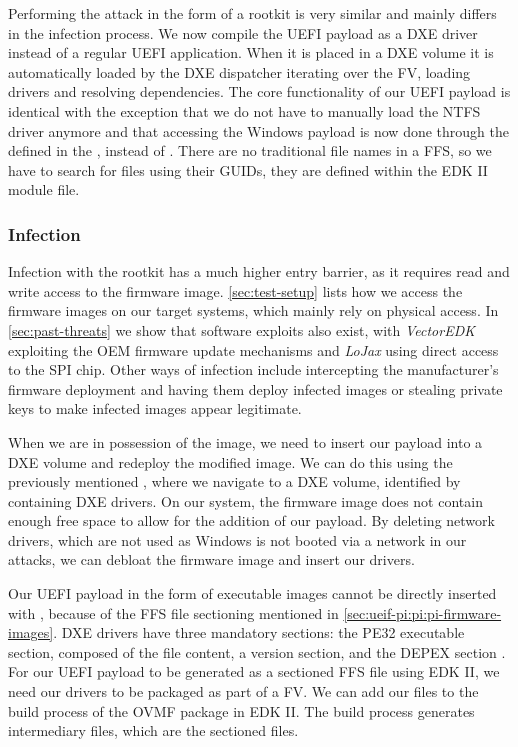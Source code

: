Performing the attack in the form of a rootkit is very similar and mainly differs in the infection process.
We now compile the \ac{UEFI} payload as a \ac{DXE} driver instead of a regular \ac{UEFI} application.
When it is placed in a \ac{DXE} volume it is automatically loaded by the \ac{DXE} dispatcher iterating over the \ac{FV}, loading drivers and resolving dependencies.
The core functionality of our \ac{UEFI} payload is identical with the exception that we do not have to manually load the \ac{NTFS} driver anymore and that accessing the Windows payload is now done through the  defined in the \cite[Section 3.4.1]{pi-spec}, instead of .
There are no traditional file names in a \ac{FFS}, so we have to search for files using their \acp{GUID}, they are defined within the \ac{EDK} II module file.

\subsubsection{Infection}

Infection with the rootkit has a much higher entry barrier, as it requires read and write access to the firmware image.
\autoref{sec:test-setup} lists how we access the firmware images on our target systems, which mainly rely on physical access.
In \autoref{sec:past-threats} we show that software exploits also exist, with \emph{VectorEDK} exploiting the \ac{OEM} firmware update mechanisms and \emph{LoJax} using direct access to the \ac{SPI} chip.
Other ways of infection include intercepting the manufacturer's firmware deployment and having them deploy infected images or stealing private keys to make infected images appear legitimate.

When we are in possession of the image, we need to insert our payload into a \ac{DXE} volume and redeploy the modified image.
We can do this using the previously mentioned , where we navigate to a \ac{DXE} volume, identified by containing \ac{DXE} drivers.
On our  system, the firmware image does not contain enough free space to allow for the addition of our payload.
By deleting network drivers, which are not used as Windows is not booted via a network in our attacks, we can debloat the firmware image and insert our drivers.

Our \ac{UEFI} payload in the form of  executable images cannot be directly inserted with , because of the \ac{FFS} file sectioning mentioned in \autoref{sec:ueif-pi:pi:pi-firmware-images}.
\ac{DXE} drivers have three mandatory sections: the \ac{PE32} executable section, composed of the  file content, a version section, and the \ac{DEPEX} section \cite[Vol. 3, 2.1.4.1.4]{pi-spec}.
For our \ac{UEFI} payload to be generated as a sectioned \ac{FFS} file using \ac{EDK} II, we need our drivers to be packaged as part of a \ac{FV}.
We can add our files to the build process of the \ac{OVMF} package in \ac{EDK} II.
The build process generates intermediary  files, which are the sectioned files.

